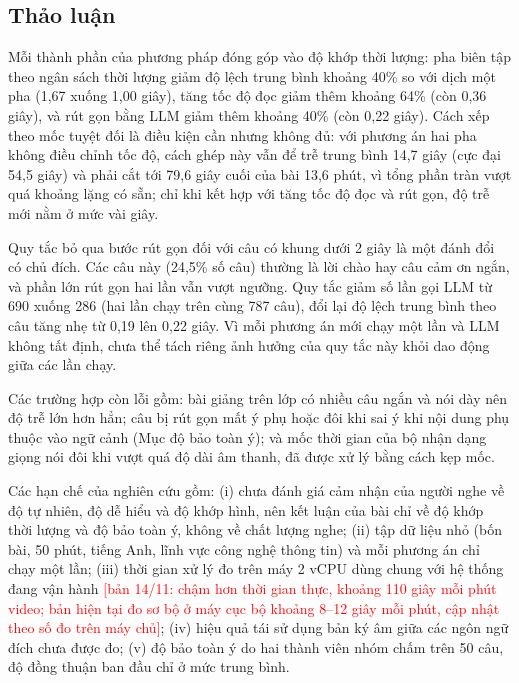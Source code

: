 \documentclass{IEEEtran}
\newcommand{\todo}[1]{\textcolor{red}{[#1]}}
\begin{document}
\subsection{Thảo luận}
Mỗi thành phần của phương pháp đóng góp vào độ khớp thời lượng: pha biên tập theo ngân sách thời lượng giảm độ lệch trung bình khoảng 40\% so với dịch một pha (1,67 xuống 1,00 giây), tăng tốc độ đọc giảm thêm khoảng 64\% (còn 0,36 giây), và rút gọn bằng LLM giảm thêm khoảng 40\% (còn 0,22 giây). Cách xếp theo mốc tuyệt đối là điều kiện cần nhưng không đủ: với phương án hai pha không điều chỉnh tốc độ, cách ghép này vẫn để trễ trung bình 14,7 giây (cực đại 54,5 giây) và phải cắt tới 79,6 giây cuối của bài 13,6 phút, vì tổng phần tràn vượt quá khoảng lặng có sẵn; chỉ khi kết hợp với tăng tốc độ đọc và rút gọn, độ trễ mới nằm ở mức vài giây.

Quy tắc bỏ qua bước rút gọn đối với câu có khung dưới 2 giây là một đánh đổi có chủ đích. Các câu này (24,5\% số câu) thường là lời chào hay câu cảm ơn ngắn, và phần lớn rút gọn hai lần vẫn vượt ngưỡng. Quy tắc giảm số lần gọi LLM từ 690 xuống 286 (hai lần chạy trên cùng 787 câu), đổi lại độ lệch trung bình theo câu tăng nhẹ từ 0,19 lên 0,22 giây. Vì mỗi phương án mới chạy một lần và LLM không tất định, chưa thể tách riêng ảnh hưởng của quy tắc này khỏi dao động giữa các lần chạy.

Các trường hợp còn lỗi gồm: bài giảng trên lớp có nhiều câu ngắn và nói dày nên độ trễ lớn hơn hẳn; câu bị rút gọn mất ý phụ hoặc đôi khi sai ý khi nội dung phụ thuộc vào ngữ cảnh (Mục độ bảo toàn ý); và mốc thời gian của bộ nhận dạng giọng nói đôi khi vượt quá độ dài âm thanh, đã được xử lý bằng cách kẹp mốc.

Các hạn chế của nghiên cứu gồm: (i) chưa đánh giá cảm nhận của người nghe về độ tự nhiên, độ dễ hiểu và độ khớp hình, nên kết luận của bài chỉ về độ khớp thời lượng và độ bảo toàn ý, không về chất lượng nghe; (ii) tập dữ liệu nhỏ (bốn bài, 50 phút, tiếng Anh, lĩnh vực công nghệ thông tin) và mỗi phương án chỉ chạy một lần; (iii) thời gian xử lý đo trên máy 2 vCPU dùng chung với hệ thống đang vận hành \todo{bản 14/11: chậm hơn thời gian thực, khoảng 110 giây mỗi phút video; bản hiện tại đo sơ bộ ở máy cục bộ khoảng 8--12 giây mỗi phút, cập nhật theo số đo trên máy chủ}; (iv) hiệu quả tái sử dụng bản ký âm giữa các ngôn ngữ đích chưa được đo; (v) độ bảo toàn ý do hai thành viên nhóm chấm trên 50 câu, độ đồng thuận ban đầu chỉ ở mức trung bình.

\end{document}
